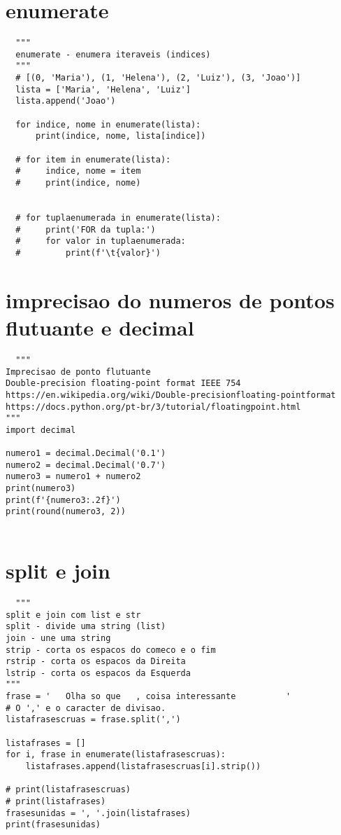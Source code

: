 \documentclass{article}
\begin{document}
\section{enumerate}
\begin{lstlisting}
  """
  enumerate - enumera iteraveis (indices)
  """
  # [(0, 'Maria'), (1, 'Helena'), (2, 'Luiz'), (3, 'Joao')]
  lista = ['Maria', 'Helena', 'Luiz']
  lista.append('Joao')
  
  for indice, nome in enumerate(lista):
      print(indice, nome, lista[indice])
  
  # for item in enumerate(lista):
  #     indice, nome = item
  #     print(indice, nome)
  
  
  # for tuplaenumerada in enumerate(lista):
  #     print('FOR da tupla:')
  #     for valor in tuplaenumerada:
  #         print(f'\t{valor}')
\end{lstlisting}
\section{imprecisao do numeros de pontos flutuante e decimal}
\begin{lstlisting}
  """
Imprecisao de ponto flutuante
Double-precision floating-point format IEEE 754
https://en.wikipedia.org/wiki/Double-precisionfloating-pointformat
https://docs.python.org/pt-br/3/tutorial/floatingpoint.html
"""
import decimal

numero1 = decimal.Decimal('0.1')
numero2 = decimal.Decimal('0.7')
numero3 = numero1 + numero2
print(numero3)
print(f'{numero3:.2f}')
print(round(numero3, 2))
  
\end{lstlisting}
\section{split e join}
\begin{lstlisting}
  """
split e join com list e str
split - divide uma string (list)
join - une uma string
strip - corta os espacos do comeco e o fim
rstrip - corta os espacos da Direita
lstrip - corta os espacos da Esquerda
"""
frase = '   Olha so que   , coisa interessante          '
# O ',' e o caracter de divisao.
listafrasescruas = frase.split(',')

listafrases = []
for i, frase in enumerate(listafrasescruas):
    listafrases.append(listafrasescruas[i].strip())

# print(listafrasescruas)
# print(listafrases)
frasesunidas = ', '.join(listafrases)
print(frasesunidas)
\end{lstlisting}
\end{document}
